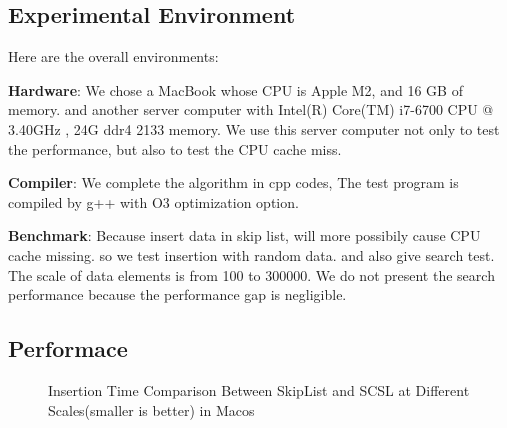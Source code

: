 \documentclass[sigconf, nonacm, letterpaper,top=2cm,bottom=2cm,left=3cm,right=3cm,marginparwidth=1.75cm]{acmart}
\begin{document}
\subsection{Experimental Environment}

Here are the overall environments:

\textbf{Hardware}: We chose a MacBook whose CPU is Apple M2, and 16 GB of memory. and another server computer with Intel(R) Core(TM) i7-6700 CPU @ 3.40GHz , 24G ddr4 2133 memory. We use this server computer not only to test the performance, but also to test the CPU cache miss.

\textbf{Compiler}: We complete the algorithm in cpp codes, The test program is compiled by g++ with O3 optimization option. 

\textbf{Benchmark}:  Because insert data in skip list, will more possibily cause CPU cache missing. so we test insertion with random data. and also give search test. The scale of data elements is from 100 to 300000. We do not present the search performance because the performance gap is negligible.


\subsection{Performace}
\begin{figure}
\centering
{}
\caption{Insertion Time Comparison Between SkipList and SCSL at Different Scales(smaller is better) in Macos}
\end{figure}
\end{document}
